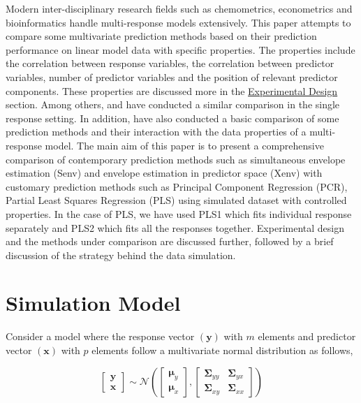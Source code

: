 \documentclass[review]{elsarticle}
\begin{document}
Modern inter-disciplinary research fields such as chemometrics,
econometrics and bioinformatics handle multi-response models
extensively. This paper attempts to compare some multivariate prediction
methods based on their prediction performance on linear model data with
specific properties. The properties include the correlation between
response variables, the correlation between predictor variables, number
of predictor variables and the position of relevant predictor
components. These properties are discussed more in the
\protect\hyperlink{experimental-design}{Experimental Design} section.
Among others, \citet{saebo2015simrel} and \citet{Alm_y_1996} have
conducted a similar comparison in the single response setting. In
addition, \citet{Rimal2018} have also conducted a basic comparison of
some prediction methods and their interaction with the data properties
of a multi-response model. The main aim of this paper is to present a
comprehensive comparison of contemporary prediction methods such as
simultaneous envelope estimation (Senv) \citep{cook2015simultaneous} and
envelope estimation in predictor space (Xenv) \citep{cook2010envelope}
with customary prediction methods such as Principal Component Regression
(PCR), Partial Least Squares Regression (PLS) using simulated dataset
with controlled properties. In the case of PLS, we have used PLS1 which
fits individual response separately and PLS2 which fits all the
responses together. Experimental design and the methods under comparison
are discussed further, followed by a brief discussion of the strategy
behind the data simulation.

\section{Simulation Model}\label{simulation-model}

Consider a model where the response vector \((\mathbf{y})\) with \(m\)
elements and predictor vector \((\mathbf{x})\) with \(p\) elements
follow a multivariate normal distribution as follows,

\begin{equation}
  \begin{bmatrix}
    \mathbf{y} \\ \mathbf{x}
  \end{bmatrix} \sim \mathcal{N}
  \left(
    \begin{bmatrix}
      \boldsymbol{\mu}_y \\
      \boldsymbol{\mu}_x
    \end{bmatrix},
    \begin{bmatrix}
    \boldsymbol{\Sigma}_{yy} & \boldsymbol{\Sigma}_{yx} \\
    \boldsymbol{\Sigma}_{xy} & \boldsymbol{\Sigma}_{xx}
    \end{bmatrix}
  \right)
  \label{eq:model-1}
\end{equation}
\end{document}

